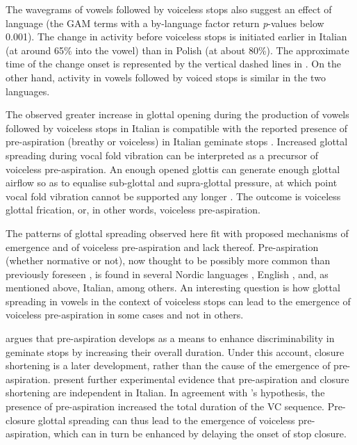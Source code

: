 \documentclass[
  11pt,
  a4paper,
]{article}
\begin{document}
The wavegrams of vowels followed by voiceless stops also suggest an
effect of language (the GAM terms with a by-language factor return
\emph{p}-values below 0.001). The change in activity before voiceless
stops is initiated earlier in Italian (at around 65\% into the vowel)
than in Polish (at about 80\%). The approximate time of the change onset
is represented by the vertical dashed lines in . On the
other hand, activity in vowels followed by voiced stops is similar in
the two languages.

The observed greater increase in glottal opening during the production
of vowels followed by voiceless stops in Italian is compatible with the
reported presence of pre-aspiration (breathy or voiceless) in Italian
geminate stops
\citep{ni-chasaide1993, stevens2004, stevens2004a, stevens2010, stevens2010b, stevens2014a}.
Increased glottal spreading during vocal fold vibration can be
interpreted as a precursor of voiceless pre-aspiration. An enough opened
glottis can generate enough glottal airflow so as to equalise
sub-glottal and supra-glottal pressure, at which point vocal fold
vibration cannot be supported any longer
\citep{berg1958, rothenberg1967, ohala2011}. The outcome is voiceless
glottal frication, or, in other words, voiceless pre-aspiration.

The patterns of glottal spreading observed here fit with proposed
mechanisms of emergence and of voiceless pre-aspiration and lack
thereof. Pre-aspiration (whether normative or not), now thought to be
possibly more common than previously foreseen \citep{helgason2002}, is
found in several Nordic languages \citet{helgason1999, helgason2002},
English \citep{gordeeva2007, nance2013, hejna2015a}, and, as mentioned
above, Italian, among others. An interesting question is how glottal
spreading in vowels in the context of voiceless stops can lead to the
emergence of voiceless pre-aspiration in some cases and not in others.

\citep{nichasaide1985} argues that pre-aspiration develops as a means to
enhance discriminability in geminate stops by increasing their overall
duration. Under this account, closure shortening is a later development,
rather than the cause of the emergence of pre-aspiration.
\citet{stevens2014} present further experimental evidence that
pre-aspiration and closure shortening are independent in Italian. In
agreement with \citeauthor{nichasaide1985}'s hypothesis, the presence of
pre-aspiration increased the total duration of the VC sequence.
Pre-closure glottal spreading can thus lead to the emergence of
voiceless pre-aspiration, which can in turn be enhanced by delaying the
onset of stop closure.
\end{document}
